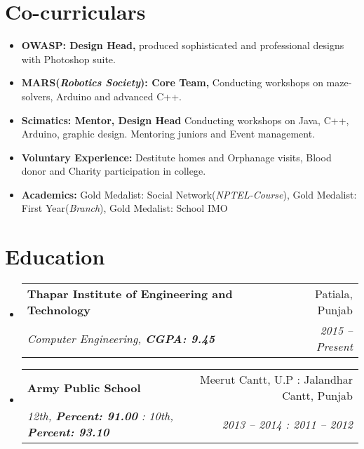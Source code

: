 \documentclass[letterpaper,9.5pt]{article}
\makeatletter
\newcommand{\resumeSubheading}[4]{
  \vspace{-1pt}\item
    \begin{tabular*}{0.97\textwidth}{l@{\extracolsep{\fill}}r}
      \textbf{#1} & #2 \\
      \textit{\small#3} & \textit{\small #4} \\
    \end{tabular*}\vspace{-5pt}
}
\newcommand{\resumeSubHeadingListStart}{\begin{itemize}[leftmargin=*]}
\newcommand{\resumeSubHeadingListEnd}{\end{itemize}}
\makeatother
\begin{document}
\section{Co-curriculars}
  \resumeSubHeadingListStart
    \item{
      \textbf{OWASP: Design Head, }{produced sophisticated and professional designs with Photoshop suite.}
         }
    \item{
      \textbf{MARS(\textit{Robotics Society}): Core Team, }{Conducting workshops on maze-solvers, Arduino and advanced C++.}
         }
    \item{
      \textbf{Scimatics: Mentor, Design Head }{Conducting workshops on Java, C++, Arduino, graphic design. Mentoring juniors and Event management.}
         }
    \item{
      \textbf{Voluntary Experience: }{Destitute homes and Orphanage visits, Blood donor and Charity participation in college.}
         }         
\item{
      \textbf{Academics: }{Gold Medalist: Social Network(\textit{NPTEL-Course}), Gold Medalist: First Year(\textit{Branch}), Gold Medalist: School IMO}
         }         

  \resumeSubHeadingListEnd

\section{Education}
  \resumeSubHeadingListStart
    \resumeSubheading
      {Thapar Institute of Engineering and Technology}{Patiala, Punjab}
      {Computer Engineering, \textbf{CGPA: 9.45}}{2015 -- Present}
    \resumeSubheading
      {Army Public School}{Meerut Cantt, U.P : Jalandhar Cantt, Punjab}
      {12th,  \textbf{Percent: 91.00} : 10th,  \textbf{Percent: 93.10}}{2013 -- 2014 : 2011 -- 2012}
  \resumeSubHeadingListEnd

\end{document}
